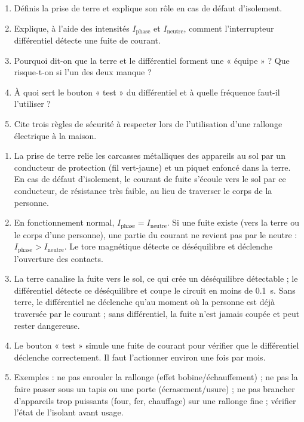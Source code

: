 \documentclass[11pt]{article}
\begin{document}
\begin{exercice}
\begin{enumerate}
\item Définis la prise de terre et explique son rôle en cas de défaut d'isolement.
\item Explique, à l'aide des intensités $I_{\text{phase}}$ et $I_{\text{neutre}}$, comment l'interrupteur différentiel détecte une fuite de courant.
\item Pourquoi dit-on que la terre et le différentiel forment une « équipe » ? Que risque-t-on si l'un des deux manque ?
\item À quoi sert le bouton « test » du différentiel et à quelle fréquence faut-il l'utiliser ?
\item Cite trois règles de sécurité à respecter lors de l'utilisation d'une rallonge électrique à la maison.
\end{enumerate}
\end{exercice}

\begin{corrige}
\begin{enumerate}
\item La prise de terre relie les carcasses métalliques des appareils au sol par un conducteur de protection (fil vert-jaune) et un piquet enfoncé dans la terre. En cas de défaut d'isolement, le courant de fuite s'écoule vers le sol par ce conducteur, de résistance très faible, au lieu de traverser le corps de la personne.
\item En fonctionnement normal, $I_{\text{phase}} = I_{\text{neutre}}$. Si une fuite existe (vers la terre ou le corps d'une personne), une partie du courant ne revient pas par le neutre : $I_{\text{phase}} > I_{\text{neutre}}$. Le tore magnétique détecte ce déséquilibre et déclenche l'ouverture des contacts.
\item La terre canalise la fuite vers le sol, ce qui crée un déséquilibre détectable ; le différentiel détecte ce déséquilibre et coupe le circuit en moins de \SI{0,1}{s}. Sans terre, le différentiel ne déclenche qu'au moment où la personne est déjà traversée par le courant ; sans différentiel, la fuite n'est jamais coupée et peut rester dangereuse.
\item Le bouton « test » simule une fuite de courant pour vérifier que le différentiel déclenche correctement. Il faut l'actionner environ une fois par mois.
\item Exemples : ne pas enrouler la rallonge (effet bobine/échauffement) ; ne pas la faire passer sous un tapis ou une porte (écrasement/usure) ; ne pas brancher d'appareils trop puissants (four, fer, chauffage) sur une rallonge fine ; vérifier l'état de l'isolant avant usage.
\end{enumerate}
\end{corrige}
\end{document}
